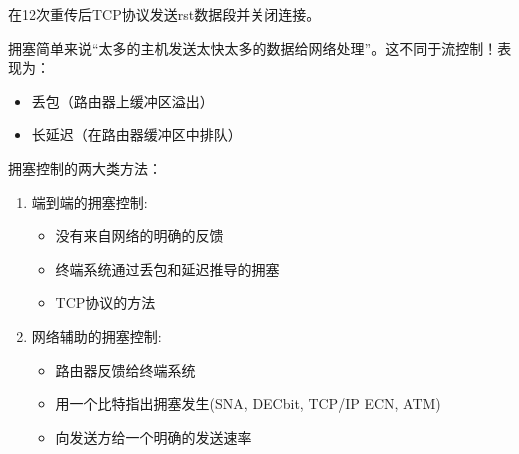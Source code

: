 在12次重传后TCP协议发送rst数据段并关闭连接。

拥塞简单来说“太多的主机发送太快太多的数据给网络处理”。这不同于流控制！表现为：
\begin{itemize}
    \item 丢包（路由器上缓冲区溢出）
    \item 长延迟（在路由器缓冲区中排队）
\end{itemize}

拥塞控制的两大类方法：
\begin{enumerate}
    \item 端到端的拥塞控制:
\begin{itemize}
    \item 没有来自网络的明确的反馈
    \item 终端系统通过丢包和延迟推导的拥塞
    \item TCP协议的方法
\end{itemize}
    \item 网络辅助的拥塞控制:
\begin{itemize}
    \item 路由器反馈给终端系统
    \item 用一个比特指出拥塞发生(SNA, DECbit, TCP/IP ECN, ATM)
    \item 向发送方给一个明确的发送速率
\end{itemize}
\end{enumerate}